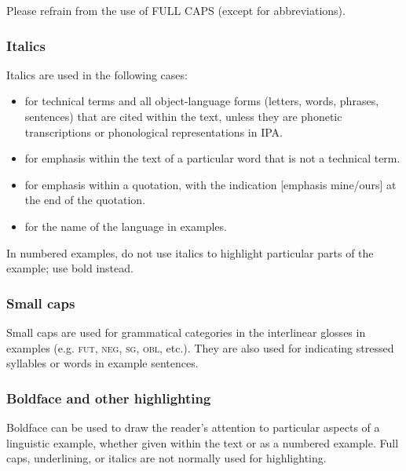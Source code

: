 \documentclass[charis,linguex]{glossa}
\begin{document}
Please refrain from the use of FULL CAPS (except for abbreviations).

\subsubsection{Italics}
Italics are used in the following cases:
\sloppy
\begin{itemize}
\item for technical terms and all object-language forms (letters, words, phrases, sentences) that are cited within the text, unless they are phonetic transcriptions or phonological representations in IPA.
\item for emphasis within the text of a particular word that is not a technical term.
\item for emphasis within a quotation, with the indication [emphasis mine/ours] at the end of the quotation.
\item for the name of the language in examples.
\end{itemize}

In numbered examples, do not use italics to highlight particular parts of the example; use bold instead.

\fussy

\subsubsection{Small caps} 

Small caps are used for grammatical categories in the interlinear glosses in examples (e.g. \textsc{fut, neg, sg, obl}, etc.). They are also used for indicating stressed syllables or words in example sentences. 

\subsubsection{Boldface and other highlighting}
Boldface can be used to draw the reader’s attention to particular aspects of a linguistic example, whether given within the text or as a numbered example. Full caps, underlining, or italics are not normally used for highlighting.
\end{document}
